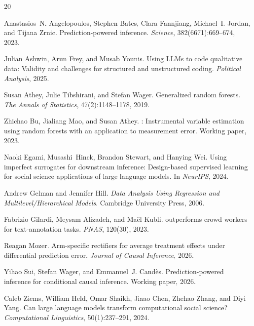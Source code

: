 \documentclass[11pt,a4paper]{article}
\begin{document}
\begin{thebibliography}{20}

Anastasios~N. Angelopoulos, Stephen Bates, Clara Fannjiang, Michael~I. Jordan, and Tijana Zrnic.
\newblock Prediction-powered inference.
\newblock \emph{Science}, 382(6671):669--674, 2023.

Julian Ashwin, Arun Frey, and Musab Younis.
\newblock Using {LLM}s to code qualitative data: Validity and challenges for structured and unstructured coding.
\newblock \emph{Political Analysis}, 2025.

Susan Athey, Julie Tibshirani, and Stefan Wager.
\newblock Generalized random forests.
\newblock \emph{The Annals of Statistics}, 47(2):1148--1178, 2019.

Zhichao Bu, Jialiang Mao, and Susan Athey.
: Instrumental variable estimation using random forests with an application to measurement error.
\newblock Working paper, 2023.

Naoki Egami, Musashi~Hinck, Brandon Stewart, and Hanying Wei.
\newblock Using imperfect surrogates for downstream inference: Design-based supervised learning for social science applications of large language models.
\newblock In \emph{NeurIPS}, 2024.

Andrew Gelman and Jennifer Hill.
\newblock \emph{Data Analysis Using Regression and Multilevel/Hierarchical Models}.
\newblock Cambridge University Press, 2006.

Fabrizio Gilardi, Meysam Alizadeh, and Ma{\"e}l Kubli.
 outperforms crowd workers for text-annotation tasks.
\newblock \emph{PNAS}, 120(30), 2023.

Reagan Mozer.
\newblock Arm-specific rectifiers for average treatment effects under differential prediction error.
\newblock \emph{Journal of Causal Inference}, 2026.

Yihao Sui, Stefan Wager, and Emmanuel~J. Cand\`{e}s.
\newblock Prediction-powered inference for conditional causal inference.
\newblock Working paper, 2026.

Caleb Ziems, William Held, Omar Shaikh, Jiaao Chen, Zhehao Zhang, and Diyi Yang.
\newblock Can large language models transform computational social science?
\newblock \emph{Computational Linguistics}, 50(1):237--291, 2024.

\end{thebibliography}
\end{document}
